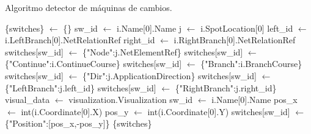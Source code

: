     \begin{algorithm}[H]
            \caption{Algoritmo detector de máquinas de cambios.}
            \label{alg:switches}
            \begin{algorithmic}
                \STATE \{switches\} $\gets$ \{\}
                            \STATE sw\_id $\gets$ i.Name[0].Name
                            \STATE j $\gets$ i.SpotLocation[0]
                            \STATE left\_id $\gets$ i.LeftBranch[0].NetRelationRef
                            \STATE right\_id $\gets$ i.RightBranch[0].NetRelationRef
                            \STATE switches[sw\_id] $\gets$ \{"Node":j.NetElementRef\}
                            \STATE switches[sw\_id] $\gets$ \{"Continue":i.ContinueCourse\}
                            \STATE switches[sw\_id] $\gets$ \{"Branch":i.BranchCourse\}
                            \STATE switches[sw\_id] $\gets$ \{"Dir":j.ApplicationDirection\}
                            \STATE switches[sw\_id] $\gets$ \{"LeftBranch":j.left\_id\}
                            \STATE switches[sw\_id] $\gets$ \{"RightBranch":j.right\_id\}
                        \ENDIF
                    \ENDFOR
                \ENDIF
                \STATE visual\_data $\gets$ visualization.Visualization
                        \STATE sw\_id $\gets$ i.Name[0].Name
                            \STATE pos\_x $\gets$ int(i.Coordinate[0].X)
                            \STATE pos\_y $\gets$ int(i.Coordinate[0].Y)
                            \STATE switches[sw\_id] $\gets$ \{"Position":[pos\_x,-pos\_y]\}
                        \ENDIF 
                    \ENDFOR
                \ENDIF
            \OUTPUT \{switches\}
            \end{algorithmic}
        \end{algorithm}